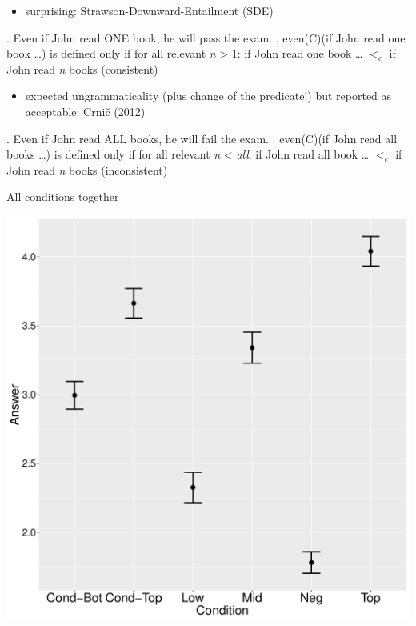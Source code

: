 \documentclass[ignorenonframetext,]{beamer}
\providecommand{\tightlist}{%
  \setlength{\itemsep}{0pt}\setlength{\parskip}{0pt}}
\begin{document}
\begin{frame}

\begin{itemize}
\tightlist
\item
  surprising: Strawson-Downward-Entailment (SDE) 
\end{itemize}

\ex. Even if John read ONE book, he will pass the exam. \a. even(C)(if
John read one book \ldots{}) is defined only if for all relevant
\emph{n} \textgreater{} 1: if John read one book \ldots{} \(<_c\) if
John read \emph{n} books \hfill (consistent)

\begin{itemize}
\tightlist
\item
  expected ungrammaticality (plus change of the predicate!) but reported
  as acceptable: Crnič (2012)
\end{itemize}

\ex. Even if John read ALL books, he will fail the exam. \a. even(C)(if
John read all books \ldots{}) is defined only if for all relevant
\emph{n} \textless{} \emph{all}: if John read all book \ldots{} \(<_c\)
if John read \emph{n} books \hfill (inconsistent)

\end{frame}

\begin{frame}{All conditions together}

\begin{center}
\includegraphics[scale=0.3]{exp1-part_1-2-errorbars.pdf}
\end{center}

\end{frame}
\end{document}
